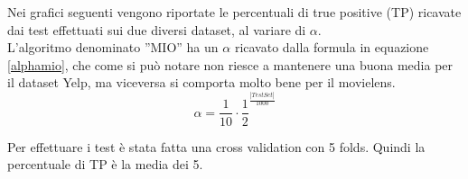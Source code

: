 \documentclass[12pt]{article}
\begin{document}

Nei grafici seguenti vengono riportate le percentuali di true positive (TP) ricavate dai test effettuati sui due diversi dataset, al variare di $\alpha$.\\
L'algoritmo denominato ''MIO'' ha un $\alpha$ ricavato dalla formula in equazione \ref{alphamio}, che come si può notare non riesce a mantenere una buona media per il dataset Yelp, ma viceversa si comporta molto bene per il movielens.\\

\begin{equation}
\alpha = \frac{1}{10} \cdot \frac{1}{2}^{\frac{|TestSet|}{1000}}
\label{alphamio}
\end{equation}

Per effettuare i test è stata fatta una cross validation con 5 folds. Quindi la percentuale di TP è la media dei 5.
\end{document}
